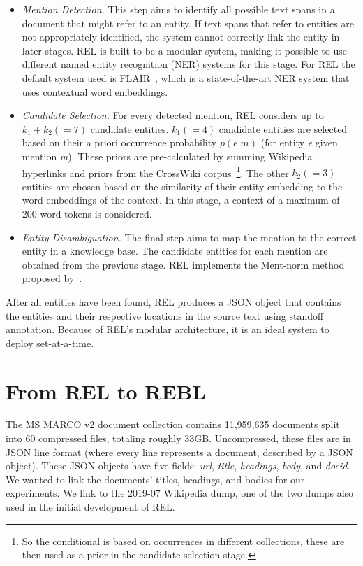 \begin{itemize}
	\item \emph{Mention Detection.} 
	This step aims to identify all possible text spans in a document that might refer to an entity. If text spans that refer to entities are not appropriately identified, the system cannot correctly link the entity in later stages. REL is built to be a modular system, making it possible to use different named entity recognition (NER) systems for this stage. For REL the default system used is FLAIR~\citep{flair}, which is a state-of-the-art NER system that uses contextual word embeddings. 
	\item \emph{Candidate Selection.}
	For every detected mention, REL considers up to $k_1 + k_2 (=7)$ candidate entities. $k_1 (=4)$ candidate entities are selected based on their a priori occurrence probability $p(e|m)$ (for entity \textit{e} given mention \textit{m}). These priors are pre-calculated by summing Wikipedia hyperlinks and priors from the CrossWiki corpus~\citep{crosswiki}\footnote{So the conditional is based on occurrences in different collections, these are then used as a prior in the candidate selection stage.}. The other $k_2 (=3)$ entities are chosen based on the similarity of their entity embedding to the word embeddings of the context. In this stage, a context of a maximum of 200-word tokens is considered.
	\item \emph{Entity Disambiguation.}
	The final step aims to map the mention to the correct entity in a knowledge base. The candidate entities for each mention are obtained from the previous stage. REL implements the Ment-norm method proposed by~\citet{ED-paper}.  
\end{itemize} 

After all entities have been found, REL produces a JSON object that contains the entities and their respective locations in the source text using standoff annotation. Because of REL's modular architecture, it is an ideal system to deploy set-at-a-time. 

\section{From REL to REBL}
The MS MARCO v2 document collection contains 11,959,635 documents split into 60 compressed files, totaling roughly 33GB. Uncompressed, these files are in JSON line format (where every line represents a document, described by a JSON object). These JSON objects have five fields: \textit{url}, \textit{title}, \textit{headings}, \textit{body}, and \textit{docid}. We wanted to link the documents' titles, headings, and bodies for our experiments. We link to the 2019-07 Wikipedia dump, one of the two dumps also used in the initial development of REL. 

